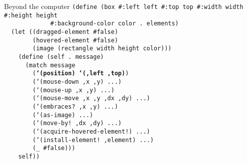 \begin{frame}{Beyond the computer}
  \tiny
  \texttt{(define (box \#:left left \#:top top \#:width width \#:height height\\
    \ \ \ \ \ \ \ \ \ \ \ \ \ \#:background-color color .\ elements)\\
    \ \ (let ((dragged-element \#false)\\
    \ \ \ \ \ \ \ \ (hovered-element \#false)\\
    \ \ \ \ \ \ \ \ (image (rectangle width height color)))\\
    \ \ \ \ (define (self .\ message)\\
    \ \ \ \ \ \ (match message\\
    \ \ \ \ \ \ \ \ (\textbf{`(position) `(,left ,top)})\\
    \ \ \ \ \ \ \ \ (`(mouse-down ,x ,y) ...)\\
    \ \ \ \ \ \ \ \ (`(mouse-up ,x ,y) ...)\\
    \ \ \ \ \ \ \ \ (`(mouse-move ,x ,y ,dx ,dy) ...)\\
    \ \ \ \ \ \ \ \ (`(embraces?\ ,x ,y) ...)\\
    \ \ \ \ \ \ \ \ (`(as-image) ...)\\
    \ \ \ \ \ \ \ \ (`(move-by!\ ,dx ,dy) ...)\\
    \ \ \ \ \ \ \ \ (`(acquire-hovered-element!) ...)\\
    \ \ \ \ \ \ \ \ (`(install-element!\ ,element) ...)\\
    \ \ \ \ \ \ \ \ (\_ \#false)))\\
    \ \ \ \ self))} \\
  \ \\ \ \\ \ \\ \ \\ \ \\ \ \\ \ \\ \ \\ \ \\ \ \\ \ 
\end{frame}

